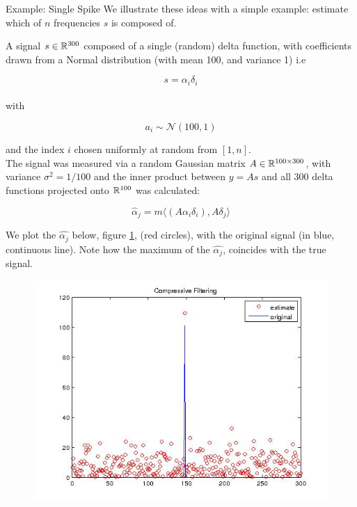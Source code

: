 \documentclass{article}
\begin{document}
\begin{example}{Example: Single Spike}
We illustrate these ideas with a simple example: estimate which of \(n\) frequencies \(s\) is composed of.

A signal \(s \in {\mathbb{R}}^{300}\) composed of a single (random) delta function, with coefficients drawn from a Normal distribution (with mean 100, and variance 1) i.e 

\begin{equation}
s = \alpha_i \delta_i
\end{equation}
\\
with 

\begin{equation}
a_i \sim \mathcal{N}\left(100, 1\right)
\end{equation}

and the index \(i\) chosen uniformly at random from \([1, n]\).
\\
The signal was measured via a random Gaussian matrix \(A \in {\mathbb{R}}^{100 \times 300}\), with variance \(\sigma^2 = 1/
100 \) and the inner product between \(y = As\) and all 300 delta functions projected onto \({\mathbb{R}}^{100}\) was calculated:

\begin{equation}
\hat{\alpha}_j = m\langle (A\alpha_i\delta_i), A\delta_j \rangle
\end{equation} 

We plot the \(\hat{\alpha_j}\) below, figure \ref{fig:new_basis_25}, (red circles), with the original signal (in blue, continuous line). Note how the maximum of the \(\hat{\alpha_j}\), coincides with the true signal.

\begin{figure}[h]
\centering
\includegraphics[height = 7.3 cm]{1spike_legend.jpg}
\caption{}
\label{fig:new_basis_25}
\end{figure}
\end{example}
\end{document}
